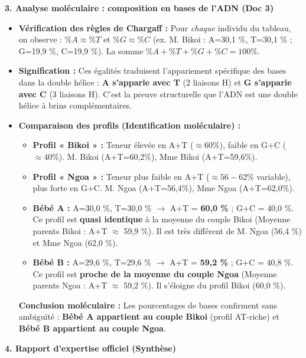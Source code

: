 \documentclass[11pt]{article}
\begin{document}
\begin{exoresolu}
\textbf{3. Analyse moléculaire : composition en bases de l'ADN (Doc 3)}
\begin{itemize}
    \item \textbf{Vérification des règles de Chargaff :} Pour \emph{chaque} individu du tableau, on observe : $\%A \approx \%T$ et $\%G \approx \%C$ (ex. M. Bikoi : A=30,1 \%, T=30,1 \% ; G=19,9 \%, C=19,9 \%). La somme $\%A+\%T+\%G+\%C = 100\%$.
    \item \textbf{Signification :} Ces égalités traduisent l'appariement spécifique des bases dans la double hélice : \textbf{A s'apparie avec T} (2 liaisons H) et \textbf{G s'apparie avec C} (3 liaisons H). C'est la preuve structurelle que l'ADN est une double hélice à brins complémentaires.
    \item \textbf{Comparaison des profils (Identification moléculaire) :}
    \begin{itemize}
        \item \textbf{Profil « Bikoi » :} Teneur élevée en A+T ($\approx 60\%$), faible en G+C ($\approx 40\%$). M. Bikoi (A+T=60,2\%), Mme Bikoi (A+T=59,6\%).
        \item \textbf{Profil « Ngoa » :} Teneur plus faible en A+T ($\approx 56-62\%$ variable), plus forte en G+C. M. Ngoa (A+T=56,4\%), Mme Ngoa (A+T=62,0\%).
        \item \textbf{Bébé A :} A=30,0 \%, T=30,0 \% $\to$ A+T = \textbf{60,0 \%} ; G+C = 40,0 \%. Ce profil est \textbf{quasi identique} à la moyenne du couple Bikoi (Moyenne parents Bikoi : A+T $\approx$ 59,9 \%). Il est très différent de M. Ngoa (56,4 \%) et Mme Ngoa (62,0 \%).
        \item \textbf{Bébé B :} A=29,6 \%, T=29,6 \% $\to$ A+T = \textbf{59,2 \%} ; G+C = 40,8 \%. Ce profil est \textbf{proche de la moyenne du couple Ngoa} (Moyenne parents Ngoa : A+T $\approx$ 59,2 \%). Il s'éloigne du profil Bikoi (60,0 \%).
    \end{itemize}
    \textbf{Conclusion moléculaire :} Les pourcentages de bases confirment sans ambiguïté : \textbf{Bébé A appartient au couple Bikoi} (profil AT-riche) et \textbf{Bébé B appartient au couple Ngoa}.
\end{itemize}

\textbf{4. Rapport d'expertise officiel (Synthèse)}


\end{exoresolu}
\end{document}
